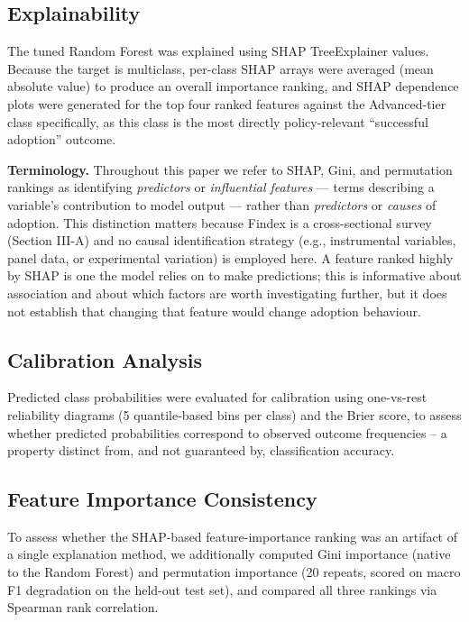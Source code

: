 \documentclass[conference]{IEEEtran}
\begin{document}
\subsection{Explainability}
\label{subsec:explainability}

The tuned Random Forest was explained using SHAP TreeExplainer values.
Because the target is multiclass, per-class SHAP arrays were averaged
(mean absolute value) to produce an overall importance ranking, and SHAP
dependence plots were generated for the top four ranked features against
the Advanced-tier class specifically, as this class is the most directly
policy-relevant ``successful adoption'' outcome.

\textbf{Terminology.} Throughout this paper we refer to SHAP, Gini, and
permutation rankings as identifying \emph{predictors} or \emph{influential
features} --- terms describing a variable's contribution to model output
--- rather than \emph{predictors} or \emph{causes} of adoption. This
distinction matters because Findex is a cross-sectional survey (Section
III-A) and no causal identification strategy (e.g., instrumental
variables, panel data, or experimental variation) is employed here. A
feature ranked highly by SHAP is one the model relies on to make
predictions; this is informative about association and about which
factors are worth investigating further, but it does not establish that
changing that feature would change adoption behaviour.
 
\subsection{Calibration Analysis}
\label{subsec:calibration_analysis_methods}
Predicted class probabilities were evaluated for calibration using one-vs-rest reliability diagrams (5 quantile-based bins per class) and the Brier score, to assess whether predicted probabilities correspond to observed outcome frequencies -- a property distinct from, and not guaranteed by, classification accuracy.
 
\subsection{Feature Importance Consistency}
\label{subsec:feature_importance_consistency_methods}
To assess whether the SHAP-based feature-importance ranking was an artifact of a single explanation method, we additionally computed Gini importance (native to the Random Forest) and permutation importance (20 repeats, scored on macro F1 degradation on the held-out test set), and compared all three rankings via Spearman rank correlation.
 
\end{document}
